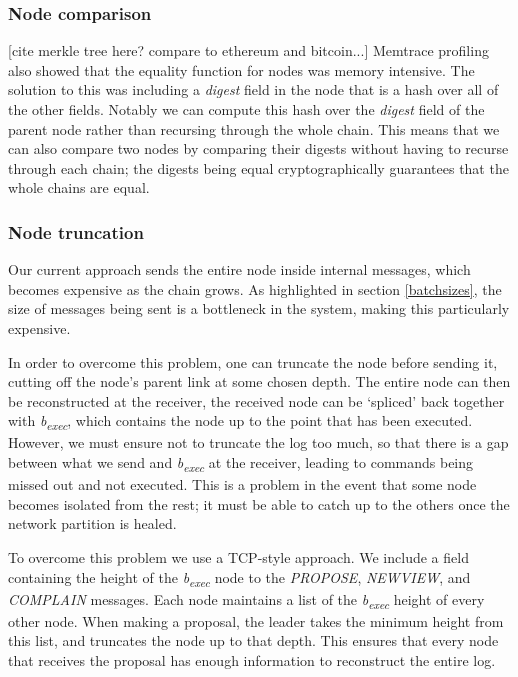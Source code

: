 \subsubsection{Node comparison}
[cite merkle tree here? compare to ethereum and bitcoin...]
Memtrace profiling also showed that the equality function for nodes was memory intensive. The solution to this was including a \textit{digest} field in the node that is a hash over all of the other fields. Notably we can compute this hash over the \textit{digest} field of the parent node rather than recursing through the whole chain. This means that we can also compare two nodes by comparing their digests without having to recurse through each chain; the digests being equal cryptographically guarantees that the whole chains are equal.

\subsubsection{Node truncation} \label{truncation}
Our current approach sends the entire node inside internal messages, which becomes expensive as the chain grows. As highlighted in section \ref{batchsizes}, the size of messages being sent is a bottleneck in the system, making this particularly expensive.

In order to overcome this problem, one can truncate the node before sending it, cutting off the node's parent link at some chosen depth. The entire node can then be reconstructed at the receiver, the received node can be `spliced' back together with \textit{b\textsubscript{exec}}, which contains the node up to the point that has been executed. However, we must ensure not to truncate the log too much, so that there is a gap between what we send and \textit{b\textsubscript{exec}} at the receiver, leading to commands being missed out and not executed. This is a problem in the event that some node becomes isolated from the rest; it must be able to catch up to the others once the network partition is healed.

To overcome this problem we use a TCP-style approach. We include a field containing the height of the \textit{b\textsubscript{exec}} node to the \textit{PROPOSE}, \textit{NEW{\large V}IEW}, and \textit{COMPLAIN} messages. Each node maintains a list of the \textit{b\textsubscript{exec}} height of every other node. When making a proposal, the leader takes the minimum height from this list, and truncates the node up to that depth. This ensures that every node that receives the proposal has enough information to reconstruct the entire log.

